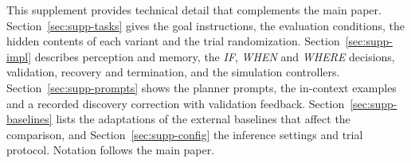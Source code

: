 This supplement provides technical detail that complements the main paper. Section~\ref{sec:supp-tasks}
gives the goal instructions, the evaluation conditions, the hidden contents of each variant and the trial
randomization. Section~\ref{sec:supp-impl} describes perception and memory, the \textit{IF},
\textit{WHEN} and \textit{WHERE} decisions, validation, recovery and termination, and the simulation
controllers. Section~\ref{sec:supp-prompts} shows the planner prompts, the in-context examples and a
recorded discovery correction with validation feedback. Section~\ref{sec:supp-baselines} lists the
adaptations of the external baselines that affect the comparison, and Section~\ref{sec:supp-config} the
inference settings and trial protocol. Notation follows the main paper.
